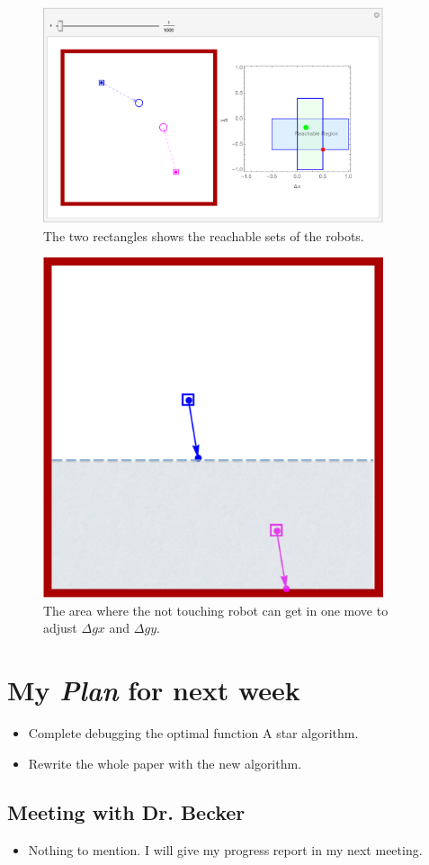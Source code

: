 \begin{figure}[h]
\begin{center}
\includegraphics[width=10cm]{ReachableRegion1move.pdf}
\caption{The two rectangles shows the reachable sets of the robots.}
\end{center}
\end{figure}
\begin{figure}[h]
\begin{center}
\includegraphics[width=10cm]{twoRobotRegion.pdf}
\caption{The area where the not touching robot can get in one move to adjust $\Delta gx$ and $\Delta gy$.}
\end{center}
\end{figure}
\section{My \emph{Plan} for next week}

\begin{itemize}
\item Complete debugging the optimal function A star algorithm.
\item Rewrite the whole paper with the new algorithm.
\end{itemize}

\subsection{Meeting with Dr. Becker  }

\begin{itemize}
\item Nothing to mention. I will give my progress report in my next meeting. 
\end{itemize}


